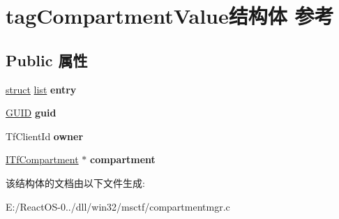 \hypertarget{structtag_compartment_value}{}\section{tag\+Compartment\+Value结构体 参考}
\label{structtag_compartment_value}
\subsection*{Public 属性}
\begin{DoxyCompactItemize}
\item 
\mbox{\label{structtag_compartment_value_a0750757c4ae7dc445708223c995506dd}} 
\hyperlink{interfacestruct}{struct} \hyperlink{classlist}{list} {\bfseries entry}
\item 
\mbox{\label{structtag_compartment_value_a37d1e3513a3784d38f8b64ef9906390d}} 
\hyperlink{interface_g_u_i_d}{G\+U\+ID} {\bfseries guid}
\item 
\mbox{\label{structtag_compartment_value_ae6e50e91a66fef52fa87eff62948ca3f}} 
Tf\+Client\+Id {\bfseries owner}
\item 
\mbox{\label{structtag_compartment_value_a29d7fae5ecc7bb70bcde15af91b62dae}} 
\hyperlink{interface_i_tf_compartment}{I\+Tf\+Compartment} $\ast$ {\bfseries compartment}
\end{DoxyCompactItemize}


该结构体的文档由以下文件生成\+:\begin{DoxyCompactItemize}
\item 
E\+:/\+React\+O\+S-\/0../dll/win32/msctf/compartmentmgr.\+c\end{DoxyCompactItemize}
